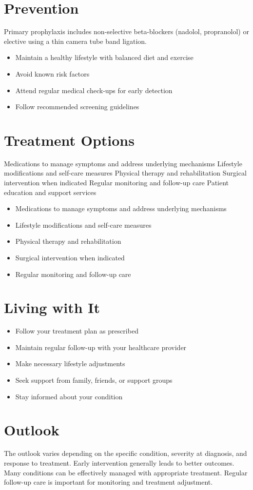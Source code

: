 \section{Prevention}
Primary prophylaxis includes non-selective beta-blockers (nadolol, propranolol) or elective using a thin camera tube band ligation.

\begin{itemize}[noitemsep]
  \item Maintain a healthy lifestyle with balanced diet and exercise
  \item Avoid known risk factors
  \item Attend regular medical check-ups for early detection
  \item Follow recommended screening guidelines
\end{itemize}
\section{Treatment Options}
Medications to manage symptoms and address underlying mechanisms Lifestyle modifications and self-care measures Physical therapy and rehabilitation Surgical intervention when indicated Regular monitoring and follow-up care Patient education and support services

\begin{itemize}[noitemsep]
  \item Medications to manage symptoms and address underlying mechanisms
  \item Lifestyle modifications and self-care measures
  \item Physical therapy and rehabilitation
  \item Surgical intervention when indicated
  \item Regular monitoring and follow-up care
\end{itemize}
\section{Living with It}
\begin{itemize}[noitemsep]
  \item Follow your treatment plan as prescribed
  \item Maintain regular follow-up with your healthcare provider
  \item Make necessary lifestyle adjustments
  \item Seek support from family, friends, or support groups
  \item Stay informed about your condition
\end{itemize}
\section{Outlook}
The outlook varies depending on the specific condition, severity at diagnosis, and response to treatment. Early intervention generally leads to better outcomes. Many conditions can be effectively managed with appropriate treatment. Regular follow-up care is important for monitoring and treatment adjustment.
